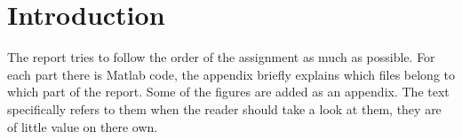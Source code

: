 \section{Introduction}
The report tries to follow the order of the assignment as much as possible. For each part there is Matlab code, the appendix briefly explains which files belong to which part of the report. Some of the figures are added as an appendix. The text specifically refers to them when the reader should take a look at them, they are of little value on there own.